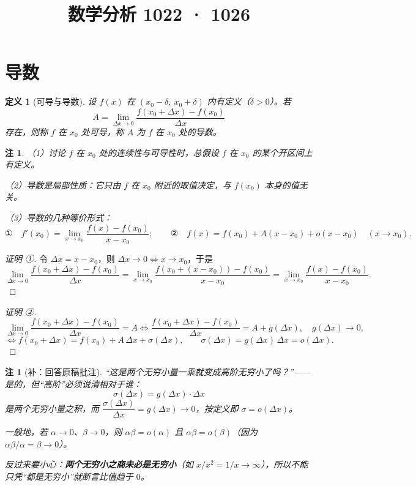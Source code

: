 \documentclass[UTF8,11pt]{ctexart}
\title{数学分析 1022 · 1026}
\date{}
\theoremstyle{cnthm}
\newtheorem{defn}[thm]{定义}
\newtheorem{rem}[thm]{注}
\begin{document}
\maketitle

\section{导数}

\begin{defn}[可导与导数]
设 $f(x)$ 在 $(x_0-\delta,\ x_0+\delta)$ 内有定义（$\delta>0$）。若
\[
A=\lim_{\Delta x\to 0}\frac{f(x_0+\Delta x)-f(x_0)}{\Delta x}
\]
存在，则称 $f$ 在 $x_0$ 处可导，称 $A$ 为 $f$ 在 $x_0$ 处的导数。
\end{defn}

\begin{rem}
（1）讨论 $f$ 在 $x_0$ 处的连续性与可导性时，总假设 $f$ 在 $x_0$ 的某个开区间上有定义。

（2）导数是局部性质：它只由 $f$ 在 $x_0$ 附近的取值决定，与 $f(x_0)$ 本身的值无关。

（3）导数的几种等价形式：
\[
\text{①}\quad f'(x_0)=\lim_{x\to x_0}\frac{f(x)-f(x_0)}{x-x_0};
\qquad
\text{②}\quad f(x)=f(x_0)+A(x-x_0)+o(x-x_0)\quad(x\to x_0).
\]
\end{rem}

\begin{proof}[证明 ①]
令 $\Delta x=x-x_0$，则 $\Delta x\to0\iff x\to x_0$，于是
\[
\lim_{\Delta x\to0}\frac{f(x_0+\Delta x)-f(x_0)}{\Delta x}
=\lim_{x\to x_0}\frac{f(x_0+(x-x_0))-f(x_0)}{x-x_0}
=\lim_{x\to x_0}\frac{f(x)-f(x_0)}{x-x_0}.
\]
\end{proof}

\begin{proof}[证明 ②]
\[
\lim_{\Delta x\to0}\frac{f(x_0+\Delta x)-f(x_0)}{\Delta x}=A
\iff \frac{f(x_0+\Delta x)-f(x_0)}{\Delta x}=A+g(\Delta x),\quad g(\Delta x)\to0,
\]
\[
\iff f(x_0+\Delta x)=f(x_0)+A\,\Delta x+\sigma(\Delta x),
\qquad \sigma(\Delta x)=g(\Delta x)\,\Delta x=o(\Delta x).
\]
\end{proof}

\begin{rem}[补：回答原稿批注]
“这是两个无穷小量一乘就变成高阶无穷小了吗？”——是的，但“高阶”必须说清相对于谁：
\[
\sigma(\Delta x)=g(\Delta x)\cdot\Delta x
\]
是两个无穷小量之积，而 $\dfrac{\sigma(\Delta x)}{\Delta x}=g(\Delta x)\to 0$，按定义即 $\sigma=o(\Delta x)$。

一般地，若 $\alpha\to0$、$\beta\to0$，则 $\alpha\beta=o(\alpha)$ 且 $\alpha\beta=o(\beta)$（因为 $\alpha\beta/\alpha=\beta\to0$）。

反过来要小心：\textbf{两个无穷小之商未必是无穷小}（如 $x/x^2=1/x\to\infty$），所以不能只凭“都是无穷小”就断言比值趋于 $0$。
\end{rem}
\end{document}
